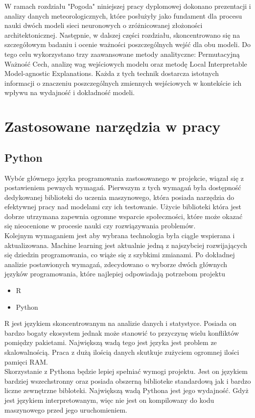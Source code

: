 \documentclass[a4paper,twoside,12pt]{book}
\begin{document}
W ramach rozdziału "Pogoda" niniejszej pracy dyplomowej dokonano prezentacji i analizy danych meteorologicznych, które posłużyły jako fundament dla procesu nauki dwóch modeli sieci neuronowych o zróżnicowanej złożoności architektonicznej. Następnie, w dalszej części rozdziału, skoncentrowano się na szczegółowym badaniu i ocenie ważności poszczególnych wejść dla obu modeli. Do tego celu wykorzystano trzy zaawansowane metody analityczne: Permutacyjną Ważność Cech, analizę wag wejściowych modelu oraz metodę Local Interpretable Model-agnostic Explanations. Każda z tych technik dostarcza istotnych informacji o znaczeniu poszczególnych zmiennych wejściowych w kontekście ich wpływu na wydajność i dokładność modeli.


\chapter{Zastosowane narzędzia w pracy}
\label{ch:wymagania-i-narzedzia}
\section{Python}
Wybór głównego języka programowania zastosowanego w projekcie, wiązał się z postawieniem pewnych wymagań. Pierwszym z tych wymagań była dostępność dedykowanej biblioteki do uczenia maszynowego, która posiada narzędzia do efektywnej pracy nad modelami czy ich testowanie. Użycie biblioteki która jest dobrze utrzymana zapewnia ogromne wsparcie społeczności, które może okazać się nieocenione w procesie nauki czy rozwiązywania problemów.\\Kolejnym wymaganiem jest aby wybrana technologia była ciągle wspierana i aktualizowana. Machine learning jest aktualnie jedną z najszybciej rozwijających się dziedzin programowania, co wiąże się z szybkimi zmianami. Po dokładnej analizie postawionych wymagań, zdecydowano o wyborze dwóch głównych języków programowania, które najlepiej odpowiadają potrzebom projektu
\begin{itemize}
	\item R
	\item Python
\end{itemize}

R jest językiem skoncentrowanym na analizie danych i statystyce. Posiada on bardzo bogaty ekosystem jednak może stanowić to przyczynę wielu konfliktów pomiędzy pakietami. Największą wadą tego jest języka jest problem ze skalowalnością. Praca z dużą ilością danych skutkuje zużyciem ogromnej ilości pamięci RAM.\\ Skorzystanie z Pythona będzie lepiej spełniać wymogi projektu. Jest on językiem bardziej wszechstronny oraz posiada obszerną biblioteke standardową jak i bardzo liczne zewnętrzne bibloteki. Największą wadą Pythona jest jego wydajność. Gdyż jest językiem interpretowanym, więc nie jest on kompilowany do kodu maszynowego przed jego uruchomieniem.
\end{document}
